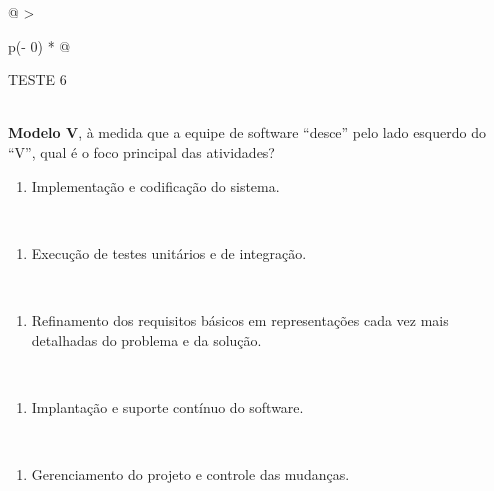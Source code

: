 \documentclass[
]{book}
\providecommand{\tightlist}{%
  \setlength{\itemsep}{0pt}\setlength{\parskip}{0pt}}
\begin{document}
\begin{longtable}[]{@{}
  >{\raggedright\arraybackslash}p{(\columnwidth - 0\tabcolsep) * }@{}}
\toprule\noalign{}
\begin{minipage}[b]{\linewidth}\raggedright
TESTE 6
\end{minipage} \\
\midrule\noalign{}
\endhead
\bottomrule\noalign{}
\endlastfoot
\textbf{Modelo V}, à medida que a equipe de software ``desce'' pelo lado esquerdo do ``V'', qual é o foco principal das atividades? \\
\begin{minipage}[t]{\linewidth}\raggedright
\begin{enumerate}
\def\labelenumi{\Alph{enumi})}
\tightlist
\item
  Implementação e codificação do sistema.
\end{enumerate}
\end{minipage} \\
\begin{minipage}[t]{\linewidth}\raggedright
\begin{enumerate}
\def\labelenumi{\Alph{enumi})}
\setcounter{enumi}{1}
\tightlist
\item
  Execução de testes unitários e de integração.
\end{enumerate}
\end{minipage} \\
\begin{minipage}[t]{\linewidth}\raggedright
\begin{enumerate}
\def\labelenumi{\Alph{enumi})}
\setcounter{enumi}{2}
\tightlist
\item
  Refinamento dos requisitos básicos em representações cada vez mais detalhadas do problema e da solução.
\end{enumerate}
\end{minipage} \\
\begin{minipage}[t]{\linewidth}\raggedright
\begin{enumerate}
\def\labelenumi{\Alph{enumi})}
\setcounter{enumi}{3}
\tightlist
\item
  Implantação e suporte contínuo do software.
\end{enumerate}
\end{minipage} \\
\begin{minipage}[t]{\linewidth}\raggedright
\begin{enumerate}
\def\labelenumi{\Alph{enumi})}
\setcounter{enumi}{4}
\tightlist
\item
  Gerenciamento do projeto e controle das mudanças.
\end{enumerate}
\end{minipage} \\
\end{longtable}
\end{document}
